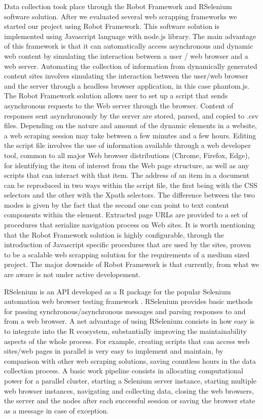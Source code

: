 \documentclass[]{article}
\begin{document}
Data collection took place through the Robot Framework and RSelenium software solution. 
After we evaluated several web scrapping frameworks we started our project using Robot Framework. This software solution is implemented using Javascript language with node.js library.
The main advantage of this framework is that it can automatically access asynchronous and dynamic web content by simulating the interaction between a user / web browser and a web server. Automating the collection of information from dynamically generated content sites involves simulating the interaction between the user/web browser and the server through a headless browser application, in this case phantom.js. The Robot Framework solution allows user to set up a script that sends asynchronous requests to the Web server through the browser. Content of responses sent asynchronously by the server are stored, parsed, and copied to .csv files. Depending on the nature and amount of the dynamic elements in a website, a web scraping session may take between a few minutes and a few hours.
Editing the script file involves the use of information available through a web developer tool, common to all major Web browser distributions (Chrome, Firefox, Edge), for identifying the item of interest from the Web page structure, as well as any scripts that can interact with that item. The address of an item in a document can be reproduced in two ways within the script file, the first being with the CSS selectors and the other with the Xpath selectors. The difference between the two modes is given by the fact that the second one can point to text content components within the element. Extracted page URLs are provided to a set of procedures that serialize navigation process on Web sites. It is worth mentioning that the Robot Framework solution is highly configurable, through the introduction of Javascript specific procedures that are used by the sites, proven to be a scalable web scrapping solution for the requirements of a medium sized project. The major downside of Robot Framework is that currently, from what we are aware is not under active developement.

RSelenium \cite{rs1} is an API developed as a R package for the popular Selenium automation web browser testing framework \cite{}. RSelenium provides basic methods for passing synchronous/asynchronous messages and parsing responses to and from a web browser. A net advantage of using RSelenium consists in how easy is to integrate into the R ecosystem, substantially improving the maintainability aspects of the whole process. For example, creating scripts that can access web sites/web pages in parallel \cite{dopar}\cite{foreach} is very easy to implement and maintain, by comparison with other web scraping solutions, saving countless hours in the data collection process. A basic work pipeline consists in allocating computational power for a parallel cluster, starting a Selenium server instance, starting multiple web browser instances, navigating and collecting data, closing the web browsers, the server and the nodes after each successful session or saving the browser state as a message in case of exception.   
\end{document}
